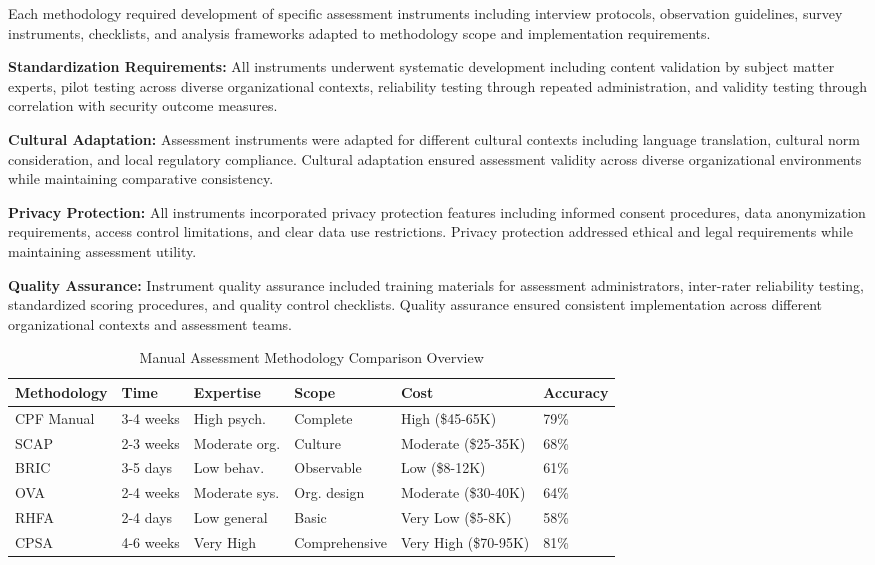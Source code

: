 \documentclass[10pt, twocolumn]{article}
\begin{document}
Each methodology required development of specific assessment instruments including interview protocols, observation guidelines, survey instruments, checklists, and analysis frameworks adapted to methodology scope and implementation requirements.

\textbf{Standardization Requirements:} All instruments underwent systematic development including content validation by subject matter experts, pilot testing across diverse organizational contexts, reliability testing through repeated administration, and validity testing through correlation with security outcome measures.

\textbf{Cultural Adaptation:} Assessment instruments were adapted for different cultural contexts including language translation, cultural norm consideration, and local regulatory compliance. Cultural adaptation ensured assessment validity across diverse organizational environments while maintaining comparative consistency.

\textbf{Privacy Protection:} All instruments incorporated privacy protection features including informed consent procedures, data anonymization requirements, access control limitations, and clear data use restrictions. Privacy protection addressed ethical and legal requirements while maintaining assessment utility.

\textbf{Quality Assurance:} Instrument quality assurance included training materials for assessment administrators, inter-rater reliability testing, standardized scoring procedures, and quality control checklists. Quality assurance ensured consistent implementation across different organizational contexts and assessment teams.

\begin{table*}[t]
\caption{Manual Assessment Methodology Comparison Overview}
\label{tab:methodology_comparison}
\centering
\small
\begin{tabular}{@{}p{2.2cm} p{1.8cm} p{2.0cm} p{2.0cm} p{2.2cm} p{2.0cm}@{}}
\toprule
\textbf{Methodology} & \textbf{Time} & \textbf{Expertise} & \textbf{Scope} & \textbf{Cost} & \textbf{Accuracy} \\
\midrule
CPF Manual & 3-4 weeks & High psych. & Complete & High (\$45-65K) & 79\% \\
SCAP & 2-3 weeks & Moderate org. & Culture & Moderate (\$25-35K) & 68\% \\
BRIC & 3-5 days & Low behav. & Observable & Low (\$8-12K) & 61\% \\
OVA & 2-4 weeks & Moderate sys. & Org. design & Moderate (\$30-40K) & 64\% \\
RHFA & 2-4 days & Low general & Basic & Very Low (\$5-8K) & 58\% \\
CPSA & 4-6 weeks & Very High & Comprehensive & Very High (\$70-95K) & 81\% \\
\bottomrule
\end{tabular}
\end{table*}
\end{document}
